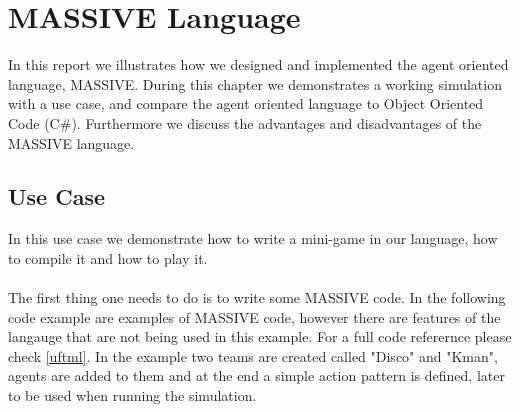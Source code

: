 \chapter{MASSIVE Language}
\label{usecase}

In this report we illustrates how we designed and implemented the agent oriented language, MASSIVE. During this chapter we demonstrates a working simulation with a use case, and compare the agent oriented language to Object Oriented Code (C\#). Furthermore we discuss the advantages and disadvantages of the MASSIVE language. 

\section{Use Case}
In this use case we demonstrate how to write a mini-game in our language, how to compile it and how to play it. \\
 \\
The first thing one needs to do is to write some MASSIVE code. In the following code example are examples of MASSIVE code, however there are features of the langauge that are not being used in this example. For a full code referernce please check \ref{uftml}. In the example two teams are created called "Disco" and "Kman", agents are added to them and at the end a simple action pattern is defined, later to be used when running the simulation.

